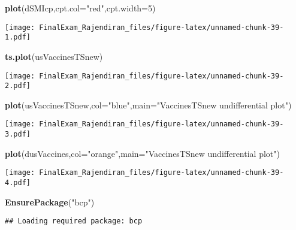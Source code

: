\documentclass[]{article}
\newenvironment{Shaded}{\begin{snugshade}}{\end{snugshade}}
\newcommand{\DataTypeTok}[1]{\textcolor[rgb]{0.13,0.29,0.53}{#1}}
\newcommand{\DecValTok}[1]{\textcolor[rgb]{0.00,0.00,0.81}{#1}}
\newcommand{\KeywordTok}[1]{\textcolor[rgb]{0.13,0.29,0.53}{\textbf{#1}}}
\newcommand{\NormalTok}[1]{#1}
\newcommand{\StringTok}[1]{\textcolor[rgb]{0.31,0.60,0.02}{#1}}
\begin{document}
\begin{Shaded}
\begin{Highlighting}[]
\KeywordTok{plot}\NormalTok{(dSMIcp,}\DataTypeTok{cpt.col=}\StringTok{"red"}\NormalTok{,}\DataTypeTok{cpt.width=}\DecValTok{5}\NormalTok{)}
\end{Highlighting}
\end{Shaded}

\texttt{[image: FinalExam\_Rajendiran\_files/figure-latex/unnamed-chunk-39-1.pdf]}

\begin{Shaded}
\begin{Highlighting}[]
\KeywordTok{ts.plot}\NormalTok{(usVaccinesTSnew)}
\end{Highlighting}
\end{Shaded}

\texttt{[image: FinalExam\_Rajendiran\_files/figure-latex/unnamed-chunk-39-2.pdf]}

\begin{Shaded}
\begin{Highlighting}[]
\KeywordTok{plot}\NormalTok{(usVaccinesTSnew,}\DataTypeTok{col=}\StringTok{"blue"}\NormalTok{,}\DataTypeTok{main=}\StringTok{"VaccinesTSnew undifferential plot"}\NormalTok{)}
\end{Highlighting}
\end{Shaded}

\texttt{[image: FinalExam\_Rajendiran\_files/figure-latex/unnamed-chunk-39-3.pdf]}

\begin{Shaded}
\begin{Highlighting}[]
\KeywordTok{plot}\NormalTok{(dusVaccines,}\DataTypeTok{col=}\StringTok{"orange"}\NormalTok{,}\DataTypeTok{main=}\StringTok{"VaccinesTSnew undifferential plot"}\NormalTok{)}
\end{Highlighting}
\end{Shaded}

\texttt{[image: FinalExam\_Rajendiran\_files/figure-latex/unnamed-chunk-39-4.pdf]}

\begin{Shaded}
\begin{Highlighting}[]
\KeywordTok{EnsurePackage}\NormalTok{(}\StringTok{"bcp"}\NormalTok{)}
\end{Highlighting}
\end{Shaded}

\begin{verbatim}
## Loading required package: bcp
\end{verbatim}
\end{document}
